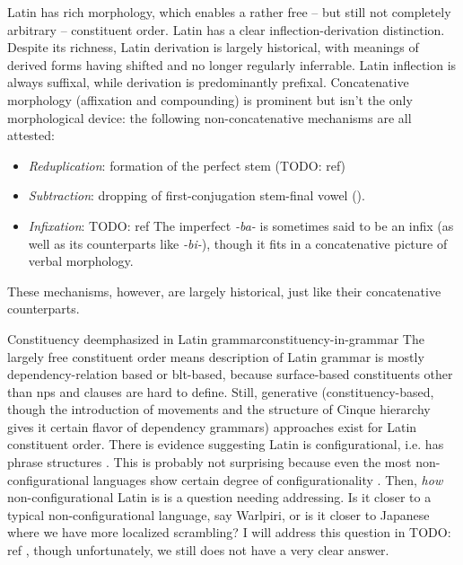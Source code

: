 \documentclass[UTF8, a4paper, oneside]{report}
\newcommand{\corpus}[1]{\emph{#1}}
\begin{document}
Latin has rich morphology,
which enables a rather free -- but still not completely arbitrary -- constituent order.
Latin has a clear inflection-derivation distinction.
Despite its richness, 
Latin derivation is largely historical,
with meanings of derived forms 
having shifted and no longer regularly inferrable.
Latin inflection is always suffixal,
while derivation is predominantly prefixal.
Concatenative morphology (affixation and compounding) 
is prominent but isn't the only morphological device:
the following non-concatenative mechanisms are all attested:
\begin{itemize}
    \item \emph{Reduplication}: formation of the perfect stem (TODO: ref)
    \item \emph{Subtraction}: dropping of first-conjugation stem-final vowel ().
    \item \emph{Infixation}:   TODO: ref 
    The imperfect \corpus{-ba-} is sometimes said to be an infix 
    (as well as its counterparts like \corpus{-bi-}),
    though it fits in a concatenative picture of verbal morphology.
\end{itemize}
These mechanisms, however, are largely historical,
just like their concatenative counterparts.

\begin{theorybox}{Constituency deemphasized in Latin grammar}{constituency-in-grammar}
    The largely free constituent order 
    means description of Latin grammar is mostly dependency-relation based or \acs{blt}-based,
    because surface-based constituents other than \acs{np}s and clauses are hard to define.
    Still, generative (constituency-based, 
    though the introduction of movements and the structure of Cinque hierarchy
    gives it certain flavor of dependency grammars) approaches exist for Latin constituent order.
    There is evidence suggesting Latin is configurational, 
    i.e. has phrase structures \citep{danckaert2017development}.
    This is probably not surprising because
    even the most non-configurational languages show certain degree of configurationality 
    \citep[among others]{niedzielski2017clausal,morris2018evidence,legate2002warlpiri}.
    Then, \emph{how} non-configurational Latin is is a question needing addressing.
    Is it closer to a typical non-configurational language, say Warlpiri, 
    or is it closer to Japanese where we have more localized scrambling?
    I will address this question in TODO: ref ,
    though unfortunately, we still does not have a very clear answer.
\end{theorybox}
\end{document}
